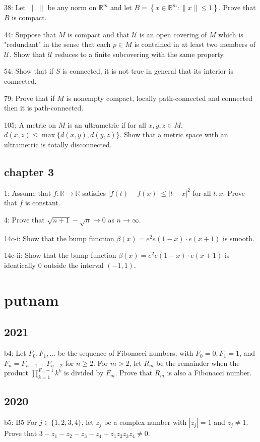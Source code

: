 \documentclass{article}
\begin{document}
38: Let $\|\hspace{4pt}\|$ be any norm on $\mathbb{R}^{m}$ and let $B=\left\{x \in \mathbb{R}^{m}:\|x\| \leq 1\right\}$. Prove that $B$ is compact. 

44: Suppose that $M$ is compact and that $\mathcal{U}$ is an open covering of $M$ which is "redundant" in the sense that each $p \in M$ is contained in at least two members of $\mathcal{U}$. Show that $\mathcal{U}$ reduces to a finite subcovering with the same property.

54: Show that if $S$ is connected, it is not true in general that its interior is connected. 

79: Prove that if $M$ is nonempty compact, locally path-connected and connected then it is path-connected.

105: A metric on $M$ is an ultrametric if for all $x, y, z \in M$, $d(x, z) \leq \max \{d(x, y), d(y, z)\} .$ Show that a metric space with an ultrametric is totally disconnected. 

\subsection*{chapter 3}
1: Assume that $f: \mathbb{R} \rightarrow \mathbb{R}$ satisfies $|f(t)-f(x)| \leq|t-x|^{2}$ for all $t, x$. Prove that $f$ is constant.

4: Prove that $\sqrt{n+1}-\sqrt{n} \rightarrow 0$ as $n \rightarrow \infty$.

14c-i: Show that the bump function $\beta(x)=e^{2} e(1-x) \cdot e(x+1)$ is smooth. 

14c-ii: Show that the bump function $\beta(x)=e^{2} e(1-x) \cdot e(x+1)$ is identically 0 outside the interval $(-1, 1)$. 

\section*{putnam}
\subsection*{2021}
b4: Let $F_{0}, F_{1}, \ldots$ be the sequence of Fibonacci numbers, with $F_{0}=0, F_{1}=1$, and $F_{n}=F_{n-1}+F_{n-2}$ for $n \geq 2$. For $m>2$, let $R_{m}$ be the remainder when the product $\prod_{k=1}^{F_{m}-1} k^{k}$ is divided by $F_{m}$. Prove that $R_{m}$ is also a Fibonacci number.

\subsection*{2020}
b5: B5 For $j \in\{1,2,3,4\}$, let $z_{j}$ be a complex number with $\left|z_{j}\right|=1$ and $z_{j} \neq 1$. Prove that $3-z_{1}-z_{2}-z_{3}-z_{4}+z_{1} z_{2} z_{3} z_{4} \neq 0 .$
\end{document}
